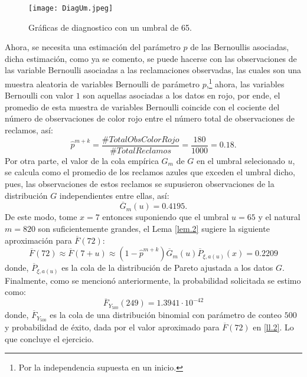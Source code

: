 \documentclass[10.5pt,notitlepage]{article}
\theoremstyle{plain}
\begin{document}
\begin{figure}[h]
\centering
\texttt{[image: DiagUm.jpeg]}
\caption{Gráficas de diagnostico con un umbral de 65.}
\label{1.11}
\end{figure}
Ahora, se necesita una estimación del parámetro \(p\) de las Bernoullis asociadas, dicha estimación, como ya se comento, se puede hacerse con las observaciones de las variable Bernoulli asociadas a las reclamaciones observadas, las cuales son una muestra aleatoria de variables Bernoulli de parámetro \(p\),\footnote{Por la independencia supuesta en un inicio.} ahora, las variables Bernoulli con valor \(1\) son aquellas asociadas a los datos en rojo, por ende, el promedio de esta muestra de variables Bernoulli coincide con el cociente del número de observaciones de color rojo entre el número total de observaciones de reclamos, así:
\[\hat{p}^{m+ k}=\frac{\#TotalObsColorRojo}{\#TotalReclamos} =\frac{180}{1000}= 0.18.\]
Por otra parte, el valor de la cola empírica \(G_{m}\) de \(G\) en el umbral selecionado \(u\), se calcula como el promedio de los reclamos azules que exceden el umbral dicho, pues, las observaciones de estos reclamos se supusieron observaciones de la distribución \(G\) independientes entre ellas, así:
\[
\overline{G}_{m}(u) = 0.4195.
\]
De este modo, tome \(x = 7\) entonces suponiendo que el umbral \(u= 65\) y el natural \(m = 820\) son suficientemente grandes, el Lema \ref{lem.2} sugiere la siguiente aproximación para \(\overline{F}(72)\): 
\begin{equation}\label{ll.2}
    \overline{F}(72) \approx \overline{F}(7+u)\approx (1-\hat{p}^{m + k})\overline{G}_{m}(u)\overline{P}_{\xi,a(u)}(x)=0.2209
\end{equation}
donde, \(\overline{P}_{\xi,a(u)}\) es la cola de la distribución de Pareto ajustada a los datos \(G\). Finalmente, como se mencionó anteriormente, la probabilidad solicitada se estimo como: 
\[\overline{F}_{Y_{500}}(249)=1.3941\cdot 10^{-42}\]
donde, \(\overline{F}_{Y_{500}}\) es la cola de una distribución binomial con parámetro de conteo \(500\) y probabilidad de éxito, dada por el valor aproximado para \(\overline{F}(72)\) en \eqref{ll.2}. Lo que concluye el ejercicio. 
\end{document}
